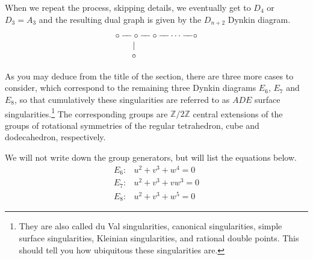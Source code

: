 \documentclass[11pt]{article}
\numberwithin{equation}{section}
\numberwithin{footnote}{section}
\newcommand{\Z}{{\mathbb Z}}
\begin{document}
\noindent
When we repeat the process, skipping details, we eventually get to $D_4$ or $D_3=A_3$ and the resulting dual graph is given by the $D_{n+2}$ Dynkin diagram.
\begin{align*}
\begin{array}{c}
\circ - \hskip -5pt - \circ - \hskip -5pt - \circ  - \hskip -5pt - \cdots  - \hskip -5pt -\circ\\
\vert \hskip 50pt ~\\
\circ \hskip 50pt~\\
\end{array}
\end{align*}

As you may deduce from the title of the section, there are three more cases to consider, which correspond to the remaining three Dynkin diagrams $E_6$, $E_7$ and $E_8$, so that cumulatively these singularities are referred to as $ADE$ surface singularities.\footnote{ They are also called du Val singularities, canonical singularities, simple surface singularities, Kleinian singularities, and rational double points. This should tell you how ubiquitous these singularities are.} The corresponding groups are $\Z/2\Z$ central extensions of the groups of rotational symmetries of the regular tetrahedron, cube and dodecahedron, respectively.

\smallskip
We will not write down the group generators, but will list the equations below.
$$
\begin{array}{ll}
E_6:& u^2 + v^3 + w^4 = 0\\
E_7:& u^2 + v^3 + vw^3 = 0\\
E_8:& u^2 + v^3 + w^5 = 0
\end{array}
$$
\end{document}

